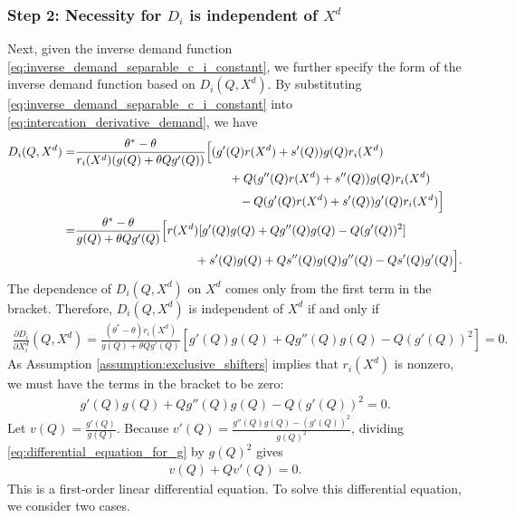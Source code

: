 \documentclass[11pt, a4paper]{article}
\theoremstyle{remark}
\begin{document}
\subsubsection*{Step 2: Necessity for $D_i$ is independent of $X^{d}$}
Next, given the inverse demand function \eqref{eq:inverse_demand_separable_c_i_constant}, we further specify the form of the inverse demand function based on $D_i(Q, X^{d})$.
By substituting \eqref{eq:inverse_demand_separable_c_i_constant} into \eqref{eq:intercation_derivative_demand}, we have
\begin{align}
    D_i(Q, X^{d}) = &\frac{\theta^{*} - \theta}{r_i(X^{d})(g(Q) + \theta Q g'(Q))}\Big[
    (g'(Q)r(X^{d}) + s'(Q) )g(Q)r_i(X^{d})\\
    & \hspace{4.5cm} + Q(g''(Q)r(X^{d}) + s''(Q))g(Q)r_i(X^{d}) \\
    &\hspace{4.8cm} - Q(g'(Q)r(X^{d}) + s'(Q))g'(Q)r_i(X^{d})\Big]\\
    =&\frac{\theta^{*} - \theta}{g(Q) + \theta Q g'(Q)}\Big[r(X^{d})[g'(Q)g(Q) + Qg{''}(Q)g(Q) - Q (g'(Q))^{2}]\\
    & \hspace{3.5cm} + s'(Q)g(Q) + Qs''(Q)g(Q)g''(Q) - Qs'(Q)g'(Q)\Big].
\end{align}
The dependence of $D_i(Q, X^{d})$ on $X^{d}$ comes only from the first term in the bracket.
Therefore, $D_i(Q, X^{d})$ is independent of $X^{d}$ if and only if
\begin{align}
    \frac{\partial D_i}{\partial X^{d}_i}(Q, X^{d}) =\frac{(\theta^{*} - \theta)r_i(X^{d})}{g(Q) + \theta Q g'(Q)} [g'(Q)g(Q) + Qg{''}(Q)g(Q) - Q (g'(Q))^{2}] = 0.
\end{align}
As Assumption \ref{assumption:exclusive_shifters} implies that $r_i(X^{d})$ is nonzero, we must have the terms in the bracket to be zero:
\begin{align}
    g'(Q)g(Q) + Qg{''}(Q)g(Q) - Q (g'(Q))^{2} = 0. \label{eq:differential_equation_for_g}
\end{align}
Let $v(Q) = \frac{g'(Q)}{g(Q)}$.
Because $v'(Q) = \frac{g''(Q)g(Q) - (g'(Q))^2}{g(Q)^2}$, dividing \eqref{eq:differential_equation_for_g} by $g(Q)^2$ gives
\begin{align}
    v(Q) + Qv'(Q) = 0. \label{eq:differential_equation_for_v}
\end{align}
This is a first-order linear differential equation.
To solve this differential equation, we consider two cases.
\end{document}
